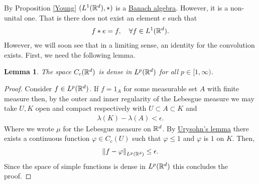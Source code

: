 \documentclass[12pt]{article}
\newtheorem{lemma}{Lemma}
\theoremstyle{remark}
\renewcommand{\norm}[1]{\left\lVert #1 \right\rVert}\renewcommand{\abs}[1]{\left| #1 \right|}
\begin{document}
By Proposition \ref{Young} $(L^1(\mathbb{R}^d),*)$ is a \href{https://en.wikipedia.org/wiki/Banach_algebra}{Banach algebra}. However, it is a non-unital one. That is there does not exist an element $e$ such that
\begin{align*}
	f*e=f , \quad\forall f \in L^1(\mathbb{R}^d).
\end{align*}
However, we will soon see that in a limiting sense, an identity for the convolution exists. First, we need the following lemma.
\begin{lemma}\label{Uryshon}
	The space $C_c(\mathbb{R}^d)$ is dense in $L^p(\mathbb{R}^d)$ for all $p \in [1,\infty)$.
\end{lemma}
\begin{proof}
	Consider $f \in  L^p(\mathbb{R}^d)$. If $f =1_A$ for some measurable set $A$ with finite measure then, by the outer and inner regularity of the Lebesgue measure we may take $U, K$ open and compact respectively with  $U \subset A \subset K$ and
	\begin{align*}
		\lambda  (K)-\lambda  (A) <\epsilon .
	\end{align*}
	Where we wrote $\mu $ for the Lebesgue measure on $\mathbb{R}^d$.
	By \href{https://en.wikipedia.org/wiki/Urysohn%27s_lemma#:~:text=for%20any%20two-,non%2Dempty,-closed%20disjoint%20subsets}{Urysohn's lemma} there exists a continuous function $\varphi \in C_c(U)$ such that $\varphi \leq 1$ and $\varphi$ is $1$ on  $K$. Then,
	\begin{align*}
		\norm{f- \varphi}_{L^p(\R^d)} \leq \epsilon .
	\end{align*}
	Since the space of simple functions is dense in $L^p(\mathbb{R}^d)$ this concludes the proof.
\end{proof}
\end{document}
